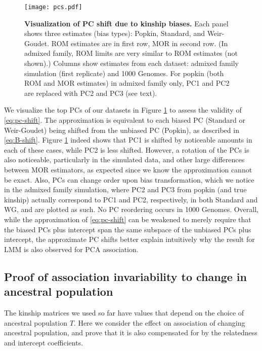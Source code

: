 \documentclass[9pt,twocolumn,twoside]{gsajnl}
\begin{document}
\begin{figure}[tb]
  \centering
  \texttt{[image: pcs.pdf]}
  \caption{
    {\bf Visualization of PC shift due to kinship biases.}
    Each panel shows three estimates (bias types): Popkin, Standard, and Weir-Goudet.
    ROM estimates are in first row, MOR in second row.
    (In admixed family, ROM limits are very similar to ROM estimates (not shown).)
    Columns show estimates from each dataset: admixed family simulation (first replicate) and 1000 Genomes.
    For popkin (both ROM and MOR estimates) in admixed family only, PC1 and PC2 are replaced with PC2 and PC3 (see text).
  }
  \label{fig:pcs}
\end{figure}

We visualize the top PCs of our datasets in Figure \ref{fig:pcs} to assess the validity of \cref{eq:pc-shift}.
The approximation is equivalent to each biased PC (Standard or Weir-Goudet) being shifted from the unbiased PC (Popkin), as described in \cref{eq:B-shift}.
Figure \ref{fig:pcs} indeed shows that PC1 is shifted by noticeable amounts in each of these cases, while PC2 is less shifted.
However, a rotation of the PCs is also noticeable, particularly in the simulated data, and other large differences between MOR estimators, as expected since we know the approximation cannot be exact.
Also, PCs can change order upon bias transformation, which we notice in the admixed family simulation, where PC2 and PC3 from popkin (and true kinship) actually correspond to PC1 and PC2, respectively, in both Standard and WG, and are plotted as such.
No PC reordering occurs in 1000 Genomes.
Overall, while the approximation of \cref{eq:pc-shift} can be weakened to merely require that the biased PCs plus intercept span the same subspace of the unbiased PCs plus intercept, the approximate PC shifts better explain intuitively why the result for LMM is also observed for PCA association.

\subsection{Proof of association invariability to change in ancestral population}

The kinship matrices we used so far have values that depend on the choice of ancestral population $T$.
Here we consider the effect on association of changing ancestral population, and prove that it is also compensated for by the relatedness and intercept coefficients.
\end{document}
